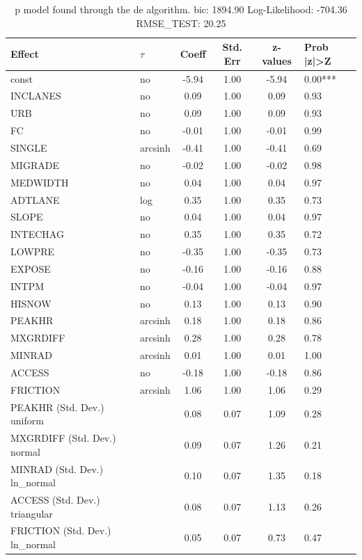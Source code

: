\begin{table}
	\caption{p model found through the de algorithm. bic: 1894.90 Log-Likelihood: -704.36 RMSE_TEST: 20.25}
	\begin{center}
		\begin{tabular}{|l|l|c|c|c|l|}
			\hline
			Effect & $\tau$ & Coeff & Std. Err & z-values & Prob |z|>Z \\
			\hline
			const & no & -5.94 & 1.00 & -5.94 & 0.00*** \\
			\hline
			INCLANES & no & 0.09 & 1.00 & 0.09 & 0.93 \\
			\hline
			URB & no & 0.09 & 1.00 & 0.09 & 0.93 \\
			\hline
			FC & no & -0.01 & 1.00 & -0.01 & 0.99 \\
			\hline
			SINGLE & arcsinh & -0.41 & 1.00 & -0.41 & 0.69 \\
			\hline
			MIGRADE & no & -0.02 & 1.00 & -0.02 & 0.98 \\
			\hline
			MEDWIDTH & no & 0.04 & 1.00 & 0.04 & 0.97 \\
			\hline
			ADTLANE & log & 0.35 & 1.00 & 0.35 & 0.73 \\
			\hline
			SLOPE & no & 0.04 & 1.00 & 0.04 & 0.97 \\
			\hline
			INTECHAG & no & 0.35 & 1.00 & 0.35 & 0.72 \\
			\hline
			LOWPRE & no & -0.35 & 1.00 & -0.35 & 0.73 \\
			\hline
			EXPOSE & no & -0.16 & 1.00 & -0.16 & 0.88 \\
			\hline
			INTPM & no & -0.04 & 1.00 & -0.04 & 0.97 \\
			\hline
			HISNOW & no & 0.13 & 1.00 & 0.13 & 0.90 \\
			\hline
			PEAKHR & arcsinh & 0.18 & 1.00 & 0.18 & 0.86 \\
			\hline
			MXGRDIFF & arcsinh & 0.28 & 1.00 & 0.28 & 0.78 \\
			\hline
			MINRAD & arcsinh & 0.01 & 1.00 & 0.01 & 1.00 \\
			\hline
			ACCESS & no & -0.18 & 1.00 & -0.18 & 0.86 \\
			\hline
			FRICTION & arcsinh & 1.06 & 1.00 & 1.06 & 0.29 \\
			\hline
			PEAKHR (Std. Dev.) uniform &  & 0.08 & 0.07 & 1.09 & 0.28 \\
			\hline
			MXGRDIFF (Std. Dev.) normal &  & 0.09 & 0.07 & 1.26 & 0.21 \\
			\hline
			MINRAD (Std. Dev.) ln_normal &  & 0.10 & 0.07 & 1.35 & 0.18 \\
			\hline
			ACCESS (Std. Dev.) triangular &  & 0.08 & 0.07 & 1.13 & 0.26 \\
			\hline
			FRICTION (Std. Dev.) ln_normal &  & 0.05 & 0.07 & 0.73 & 0.47 \\
			\hline
		\end{tabular}
	\end{center}
\end{table}